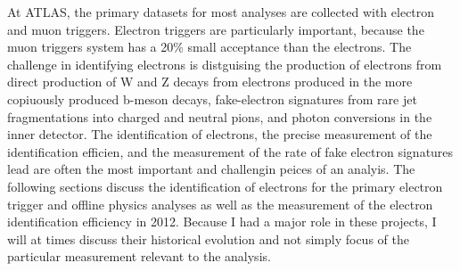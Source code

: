 At ATLAS, the primary datasets for most analyses are collected with electron and muon triggers. Electron triggers are particularly important, because the muon triggers system has a 20\% small acceptance than the electrons. The challenge in identifying electrons is distguising the production of electrons from direct production of W and Z decays from electrons produced in the more copiuously produced b-meson decays, fake-electron signatures from rare jet fragmentations into charged and neutral pions, and photon conversions in the inner detector. The identification of electrons, the precise measurement of the identification efficien, and the measurement of the rate of fake electron signatures lead are often the most important and challengin peices of an analyis. The following sections discuss the identification of electrons for the primary electron trigger and offline physics analyses as well as the measurement of the electron identification efficiency in 2012. Because I had a major role in these projects, I will at times discuss their historical evolution and not simply focus of the particular measurement relevant to the \tth analysis.  


